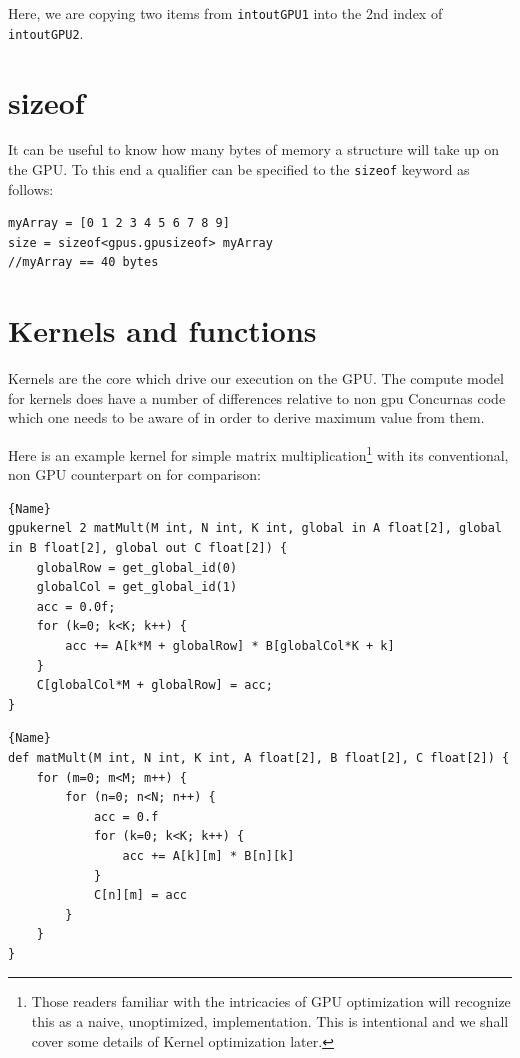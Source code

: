 \documentclass[conc-doc]{subfiles}
\begin{document}
Here, we are copying two items from \lstinline{intoutGPU1} into the 2nd index of \lstinline{intoutGPU2}.

\section{sizeof}
It can be useful to know how many bytes of memory a structure will take up on the GPU. To this end a qualifier can be specified to the \lstinline{sizeof} keyword as follows:

\begin{lstlisting}
myArray = [0 1 2 3 4 5 6 7 8 9]
size = sizeof<gpus.gpusizeof> myArray 
//myArray == 40 bytes
\end{lstlisting}

\section{Kernels and functions}
Kernels are the core which drive our execution on the GPU. The compute model for kernels does have a number of differences relative to non gpu Concurnas code which one needs to be aware of in order to derive maximum value from them.

Here is an example kernel for simple matrix multiplication\footnote{Those readers familiar with the intricacies of GPU optimization will recognize this as a naive, unoptimized, implementation. This is intentional and we shall cover some details of Kernel optimization later.} with its conventional, non GPU counterpart on for comparison:

\noindent\begin{minipage}{.45\textwidth}
	\begin{lstlisting}[caption=GPU kernel,frame=tlrb]{Name}
gpukernel 2 matMult(M int, N int, K int, global in A float[2], global in B float[2], global out C float[2]) {
	globalRow = get_global_id(0) 
	globalCol = get_global_id(1) 
	acc = 0.0f;
	for (k=0; k<K; k++) {
		acc += A[k*M + globalRow] * B[globalCol*K + k]
	}
	C[globalCol*M + globalRow] = acc;
} 
\end{lstlisting}
\end{minipage}\hfill
\begin{minipage}{.45\textwidth}
	\begin{lstlisting}[caption=CPU equivilent,frame=tlrb]{Name}
def matMult(M int, N int, K int, A float[2], B float[2], C float[2]) {
	for (m=0; m<M; m++) {
		for (n=0; n<N; n++) {
			acc = 0.f
			for (k=0; k<K; k++) {
				acc += A[k][m] * B[n][k]
			}
			C[n][m] = acc
		}
	}
}
\end{lstlisting}
\end{minipage}
\end{document}
